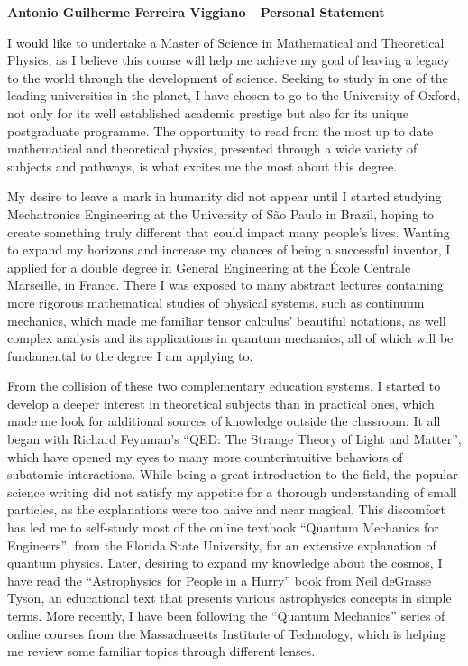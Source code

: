 \documentclass[10pt]{article}
\def\firstname{Antonio Guilherme }
\def\familyname{Ferreira Viggiano}
\def\subj{Personal Statement}
\def\FileTitle{\firstname\familyname~\textemdash~\subj}
\begin{document}
\sffamily %

{\bfseries \FileTitle}

I would like to undertake a Master of Science in Mathematical and Theoretical Physics, as I believe this course will help me achieve my goal of leaving a legacy to the world through the development of science. Seeking to study in one of the leading universities in the planet, I have chosen to go to the University of Oxford, not only for its well established academic prestige but also for its unique postgraduate programme. The opportunity to read from the most up to date mathematical and theoretical physics, presented through a wide variety of subjects and pathways, is what excites me the most about this degree.

My desire to leave a mark in humanity did not appear until I started studying Mechatronics Engineering at the University of São Paulo in Brazil, hoping to create something truly different that could impact many people's lives. Wanting to expand my horizons and increase my chances of being a successful inventor, I applied for a double degree in General Engineering at the École Centrale Marseille, in France. There I was exposed to many abstract lectures containing more rigorous mathematical studies of physical systems, such as continuum mechanics, which made me familiar tensor calculus' beautiful notations, as well complex analysis and its applications in quantum mechanics, all of which will be fundamental to the degree I am applying to.

From the collision of these two complementary education systems, I started to develop a deeper interest in theoretical subjects than in practical ones, which made me look for additional sources of knowledge outside the classroom. It all began with Richard Feynman's ``QED: The Strange Theory of Light and Matter'', which have opened my eyes to many more counterintuitive behaviors of subatomic interactions. While being a great introduction to the field, the popular science writing did not satisfy my appetite for a thorough understanding of small particles, as the explanations were too naive and near magical. This discomfort has led me to self-study most of the online textbook ``Quantum Mechanics for Engineers'', from the Florida State University, for an extensive explanation of quantum physics. Later, desiring to expand my knowledge about the cosmos, I have read the ``Astrophysics for People in a Hurry'' book from Neil deGrasse Tyson, an educational text that presents various astrophysics concepts in simple terms. More recently, I have been following the ``Quantum Mechanics'' series of online courses from the Massachusetts Institute of Technology, which is helping me review some familiar topics through different lenses.
\end{document}
